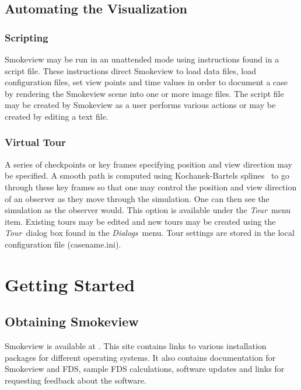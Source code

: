 \documentclass[11pt,twoside]{book}
\begin{document}
\subsection{Automating the Visualization}
\subsubsection{Scripting} Smokeview may be run in an unattended mode using
instructions found in a script file.
These instructions direct Smokeview to load data files, load configuration files,
set view points and time values in order to document a case by rendering
the Smokeview scene into one or more image files.
The script file may be created by Smokeview as a user performs various actions
or may be created by editing a text file.

\subsubsection{Virtual Tour}   A series of checkpoints or key frames
specifying position and view direction may be specified. A smooth
path is computed using Kochanek-Bartels splines~\cite{Moller:02}
to go through these key frames so that one may control the
position and view direction of an observer as they move through
the simulation. One can then see the simulation as the observer
would. This option is available under the {\em Tour}\ menu item.
Existing tours may be edited and new tours may be created using
the {\em Tour}\ dialog box found in the {\em Dialogs}\ menu. Tour
settings are stored in the local configuration file
(casename.ini).


\section{Getting Started}

\subsection{Obtaining Smokeview}

Smokeview is available at {\bf {}}.
This site contains links to various installation packages for
different operating systems. It also contains documentation for
Smokeview and FDS, sample FDS calculations, software updates and
links for requesting feedback about the software.
\end{document}
